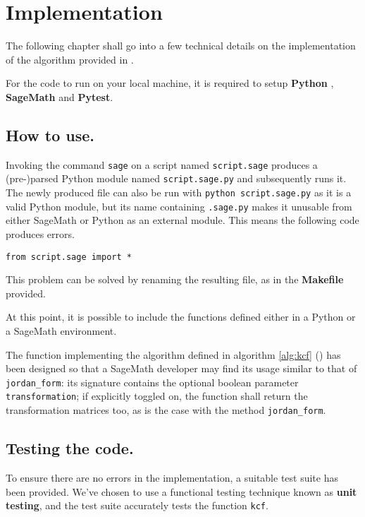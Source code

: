 \section{Implementation}
The following chapter shall go into a few technical details on the implementation of the algorithm provided in
\cite{trapani-kronecker}.

For the code to run on your local machine, it is required to setup \textbf{Python} \cite{van1995python},
\textbf{SageMath} and \textbf{Pytest}.

\subsection*{How to use.}
Invoking the command \texttt{sage} on a script named \texttt{script.sage} produces a (pre-)parsed
Python module named \texttt{script.sage.py} and subsequently runs it. The newly produced file can also
be run with \texttt{python script.sage.py} as it is a valid Python module, but its name containing
\texttt{.sage.py} makes it unusable from either SageMath or Python as an external module. This means the
following code produces errors.
\begin{verbatim}
from script.sage import *
\end{verbatim}

This problem can be solved by renaming the resulting file, as in the \textbf{Makefile} provided.

At this point, it is possible to include the functions defined either in a Python or a SageMath environment.

The function implementing the algorithm defined in algorithm \ref{alg:kcf} () has been designed
so that a SageMath developer may find its usage similar to that of \texttt{jordan_form}: its signature
contains the optional boolean parameter \texttt{transformation}; if explicitly toggled on, the function
shall return the transformation matrices too, as is the case with the method \texttt{jordan_form}.

\subsection*{Testing the code.}
To ensure there are no errors in the implementation, a suitable
test suite has been provided. We've chosen to use a functional testing technique known as \textbf{unit testing},
and the test suite accurately tests the function \texttt{kcf}.


